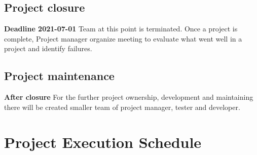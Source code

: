 \documentclass{VUMIFPSkursinis}
\begin{document}
	\subsection{Project closure}
	\textbf{Deadline 2021-07-01}
	Team at this point is terminated. Once a project is complete, Project manager organize meeting to evaluate what went well in a project and identify failures.
	\subsection{Project maintenance}
	\textbf{After closure}
	For the further project ownership, development and maintaining there will be created smaller team of project manager, tester and developer.

\section{Project Execution Schedule}
\end{document}
